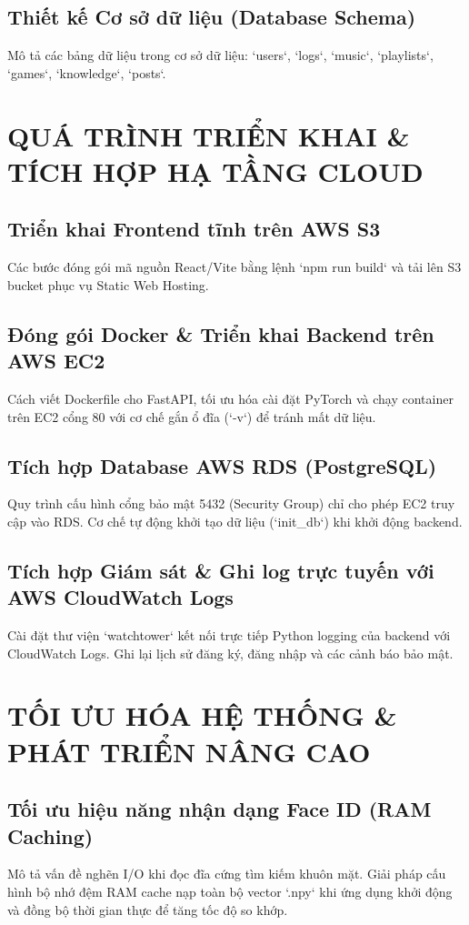 \documentclass[12pt,a4paper]{report}
\begin{document}
\section{Thiết kế Cơ sở dữ liệu (Database Schema)}
Mô tả các bảng dữ liệu trong cơ sở dữ liệu: `users`, `logs`, `music`, `playlists`, `games`, `knowledge`, `posts`.

\chapter{QUÁ TRÌNH TRIỂN KHAI \& TÍCH HỢP HẠ TẦNG CLOUD}
\section{Triển khai Frontend tĩnh trên AWS S3}
Các bước đóng gói mã nguồn React/Vite bằng lệnh `npm run build` và tải lên S3 bucket phục vụ Static Web Hosting.

\section{Đóng gói Docker \& Triển khai Backend trên AWS EC2}
Cách viết Dockerfile cho FastAPI, tối ưu hóa cài đặt PyTorch và chạy container trên EC2 cổng 80 với cơ chế gắn ổ đĩa (`-v`) để tránh mất dữ liệu.

\section{Tích hợp Database AWS RDS (PostgreSQL)}
Quy trình cấu hình cổng bảo mật 5432 (Security Group) chỉ cho phép EC2 truy cập vào RDS. Cơ chế tự động khởi tạo dữ liệu (`init_db`) khi khởi động backend.

\section{Tích hợp Giám sát & Ghi log trực tuyến với AWS CloudWatch Logs}
Cài đặt thư viện `watchtower` kết nối trực tiếp Python logging của backend với CloudWatch Logs. Ghi lại lịch sử đăng ký, đăng nhập và các cảnh báo bảo mật.

\chapter{TỐI ƯU HÓA HỆ THỐNG \& PHÁT TRIỂN NÂNG CAO}
\section{Tối ưu hiệu năng nhận dạng Face ID (RAM Caching)}
Mô tả vấn đề nghẽn I/O khi đọc đĩa cứng tìm kiếm khuôn mặt. Giải pháp cấu hình bộ nhớ đệm RAM cache nạp toàn bộ vector `.npy` khi ứng dụng khởi động và đồng bộ thời gian thực để tăng tốc độ so khớp.
\end{document}
